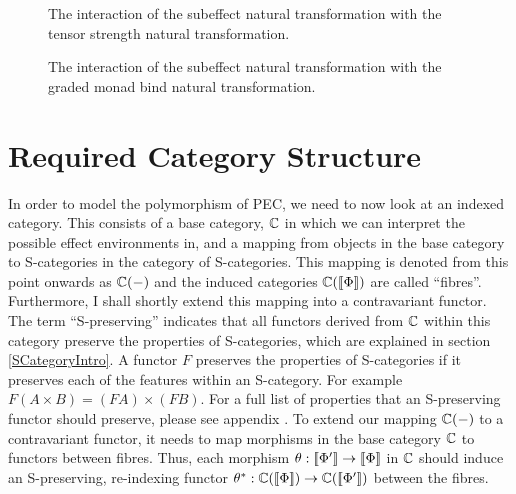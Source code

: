\documentclass{Report}
\begin{document}
\begin{figure}
\centering
\begin{minipage}{0.45\textwidth}
    \qquad
    \caption{The interaction of the subeffect natural transformation with the tensor strength natural transformation.}
    \label{SubeffectTensorStrength}
\end{minipage}  
\quad
\begin{minipage}{0.45\textwidth}
\caption{The interaction of the subeffect natural transformation with the graded monad  bind natural transformation.}
\label{SubeffectBind}
\end{minipage}  
\end{figure}


\section{Required Category Structure}\label{PECRequirements}
In order to model the polymorphism of PEC, we need to now look at an indexed category. This consists of a base category, $\mathbb{C}$ in which we can interpret the possible effect environments in, and a mapping from objects in the base category to S-categories in the category of S-categories. This mapping is denoted from this point onwards as $\mathbb{C}(-)$ and the induced categories $\mathbb{C}({\bf [\![}\Phi{\bf ]\!]})$ are called ``fibres''. Furthermore, I shall shortly extend this mapping into a contravariant functor. The term ``S-preserving'' indicates that all functors derived from $\mathbb{C}$ within this category preserve the properties of S-categories, which are explained in section \ref{SCategoryIntro}. A functor $F$ preserves the properties of S-categories if it preserves each of the features within an S-category. For example $F(A\times B) = (FA)\times (FB)$. For a full list of properties that an S-preserving functor should preserve, please see appendix . To extend our mapping $\mathbb{C}(-)$ to a contravariant functor, it needs to map morphisms in the base category $\mathbb{C}$ to functors between fibres.  Thus, each morphism $\theta: {\bf [\![}\Phi'{\bf ]\!]}\rightarrow{\bf [\![}\Phi{\bf ]\!]}$ in $\mathbb{C}$ should induce an S-preserving, re-indexing functor $\theta^*: \mathbb{C}({\bf [\![}\Phi{\bf ]\!]})\rightarrow\mathbb{C}({\bf [\![}\Phi'{\bf ]\!]})$ between the fibres.
\end{document}
